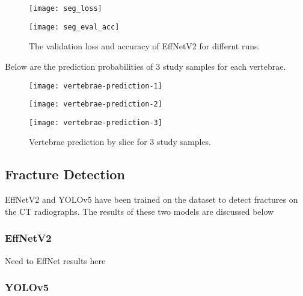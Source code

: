 \documentclass[pdflatex,sn-mathphys]{sn-jnl}%
\theoremstyle{thmstyleone}%
\theoremstyle{thmstyletwo}%
\theoremstyle{thmstylethree}%
\begin{document}
\begin{figure}[H]
 \begin{minipage}[c]{0.5\textwidth}
 \centering
    \texttt{[image: seg\_loss]}
    \label{fig:mesh5.1}
\end{minipage}
\begin{minipage}[c]{0.5\textwidth}
 \centering
    \texttt{[image: seg\_eval\_acc]}
    \label{fig:mesh5.2}
\end{minipage}
\caption{\centering\footnotesize{ The validation loss and accuracy of EffNetV2 for differnt runs. }}
\end{figure}

Below are the prediction probabilities of 3 study samples for each vertebrae.

\begin{figure}[H]
\begin{minipage}[c]{1\textwidth}
 \centering
    \texttt{[image: vertebrae-prediction-1]}
    \label{fig:mesh5.1}
\end{minipage}
\begin{minipage}[c]{1\textwidth}
 \centering
    \texttt{[image: vertebrae-prediction-2]}
    \label{fig:mesh5.2}
\end{minipage}
\begin{minipage}[c]{1\textwidth}
 \centering
    \texttt{[image: vertebrae-prediction-3]}
    \label{fig:mesh5.3}
\end{minipage}
\caption{\centering\footnotesize{ Vertebrae prediction by slice for 3 study samples. }}
\end{figure}

\subsection{Fracture Detection}\label{subsubsec2}

EffNetV2 and YOLOv5 have been trained on the dataset to detect fractures on the CT radiographs. The results of these two models are discussed below

\subsubsection{EffNetV2}

Need to EffNet results here


\subsubsection{YOLOv5}
\end{document}

